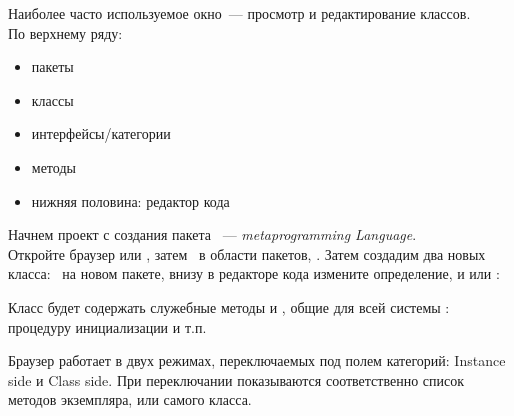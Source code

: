 \clearpage
{}

\clearpage

\noindent
Наиболее часто используемое окно\ --- просмотр и редактирование классов.\\
По верхнему ряду:
\begin{itemize}[nosep]
    \item пакеты
    \item классы
    \item интерфейсы/категории
    \item методы
    \item нижняя половина: редактор кода
\end{itemize}


\noindent
Начнем проект с создания пакета \met\ --- \textit{\emph{meta}programming \emph{Lang}uage}.\\
Откройте браузер  или , затем \keys{\rms}\ в области пакетов,
. Затем создадим два новых класса: \keys{\lms}\ на новом пакете, внизу в редакторе кода
измените определение, и   или :


Класс  будет содержать служебные методы и , 
общие для всей системы \met: процедуру инициализации и т.п.

\clearpage
{}


Браузер работает в двух режимах, переключаемых под полем категорий: Instance side и Class side. 
При переключании показываются соответственно список методов экземпляра, или самого класса.


